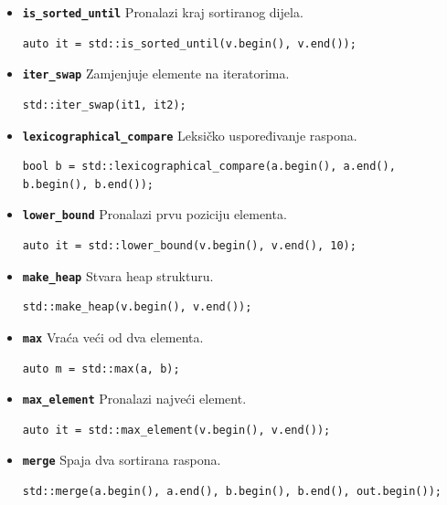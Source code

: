 \begin{itemize}
\item \textbf{\texttt{is\_sorted\_until}}\newline
Pronalazi kraj sortiranog dijela.
\begin{verbatim}
auto it = std::is_sorted_until(v.begin(), v.end());
\end{verbatim}

\item \textbf{\texttt{iter\_swap}}\newline
Zamjenjuje elemente na iteratorima.
\begin{verbatim}
std::iter_swap(it1, it2);
\end{verbatim}

\item \textbf{\texttt{lexicographical\_compare}}\newline
Leksičko uspoređivanje raspona.
\begin{verbatim}
bool b = std::lexicographical_compare(a.begin(), a.end(), b.begin(), b.end());
\end{verbatim}

\item \textbf{\texttt{lower\_bound}}\newline
Pronalazi prvu poziciju elementa.
\begin{verbatim}
auto it = std::lower_bound(v.begin(), v.end(), 10);
\end{verbatim}

\item \textbf{\texttt{make\_heap}}\newline
Stvara heap strukturu.
\begin{verbatim}
std::make_heap(v.begin(), v.end());
\end{verbatim}

\item \textbf{\texttt{max}}\newline
Vraća veći od dva elementa.
\begin{verbatim}
auto m = std::max(a, b);
\end{verbatim}

\item \textbf{\texttt{max\_element}}\newline
Pronalazi najveći element.
\begin{verbatim}
auto it = std::max_element(v.begin(), v.end());
\end{verbatim}

\item \textbf{\texttt{merge}}\newline
Spaja dva sortirana raspona.
\begin{verbatim}
std::merge(a.begin(), a.end(), b.begin(), b.end(), out.begin());
\end{verbatim}


\end{itemize}
